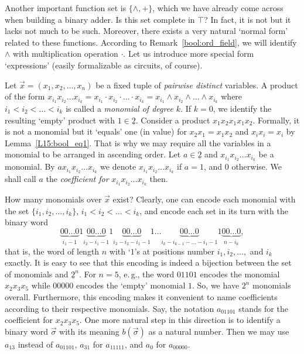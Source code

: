 \documentclass[12pt,notitlepage]{article}
\theoremstyle{plain}
\theoremstyle{definition}
\theoremstyle{plain}
\newcommand{\ul}[1]{\underline{#1}}
\newcommand{\1}{\mathbf{1}}
\newcommand{\0}{\mathbf{0}}
\begin{document}
\medskip

Another important function set is $\{ {\wedge}, {+}\}$, which we have already come across when building a binary adder. Is this set complete in $\top$? In fact, it is not but it lacks not much to be such. Moreover, there exists a very natural `normal form' related to these functions. According to Remark~\ref{bool:ord_field}, we will identify $\wedge$ with multiplication operation $\cdot$. Let us introduce more special form `expressions' (easily formalizable as circuits, of course).

Let $\vec x = (x_1, x_2, \ldots, x_n)$ be a fixed tuple of \emph{pairwise distinct} variables. A product of the form $x_{i_1} x_{i_2} \ldots x_{i_k} = x_{i_1} \cdot x_{i_2} \cdot \ldots \cdot x_{i_k} = x_{i_1} \wedge x_{i_2} \wedge \ldots \wedge x_{i_k}$ where $i_1 < i_2 < \ldots < i_k$ is called a \emph{monomial of degree $k$}. If $k = 0$, we identify the resulting `empty' product with $1 \in \ul{2}$. Consider a product $x_1 x_2 x_1 x_1 x_2$. Formally, it is not a monomial but it `equals' one (in value) for $x_2 x_1 = x_1 x_2$ and $x_i x_i = x_i$ by Lemma~\ref{L15:bool_eq1}. That is why we may require all the variables in a monomial to be arranged in ascending order. Let $a \in \ul{2}$ and $x_{i_1} x_{i_2} \ldots x_{i_k}$ be a monomial. By $a x_{i_1} x_{i_2} \ldots x_{i_k}$ we denote $x_{i_1} x_{i_2} \ldots x_{i_k}$ if $a = 1$, and $0$ otherwise. We shall call $a$ the \emph{coefficient for} $x_{i_1} x_{i_2} \ldots x_{i_k}$ then.

How many monomials over $\vec x$ exist? Clearly, one can encode each monomial with the set $\{i_1, i_2, \ldots, i_k\}$, $i_1 < i_2 < \ldots < i_k$, and encode each set in its turn with the binary word $$\underbrace{00\ldots0}_{i_1 - 1}1\underbrace{00\ldots0}_{i_2 - i_1 - 1} 1 \underbrace{00\ldots0}_{i_3 - i_2 - i_1 - 1}1 \ldots \underbrace{00\ldots0}_{i_k - i_{k-1} -\ldots - i_1 - 1} 1 \underbrace{00\ldots0}_{n - i_k},$$
that is, the word of length $n$ with `$1$'s at positions number $i_1, i_2, \ldots,$ and $i_k$ exactly. It is easy to see that this encoding is indeed a bijection between the set of monomials and $\ul{2}^n$. For $n = 5$, e.\,g., the word $01101$ encodes the monomial $x_2 x_3 x_5$ while $00000$ encodes the `empty' monomial $1$. So, we have $2^n$ monomials overall.
Furthermore, this encoding makes it convenient to name coefficients according to their respective monomials. Say, the notation $a_{01101}$ stands for the coefficient for $x_2 x_3 x_5$. One more natural step in this direction is to identify a binary word $\vec \sigma$ with its meaning $b(\vec \sigma)$ as a natural number. Then we may use $a_{13}$ instead of $a_{01101}$, $a_{31}$ for $a_{11111}$, and $a_0$ for $a_{00000}$.
\end{document}
